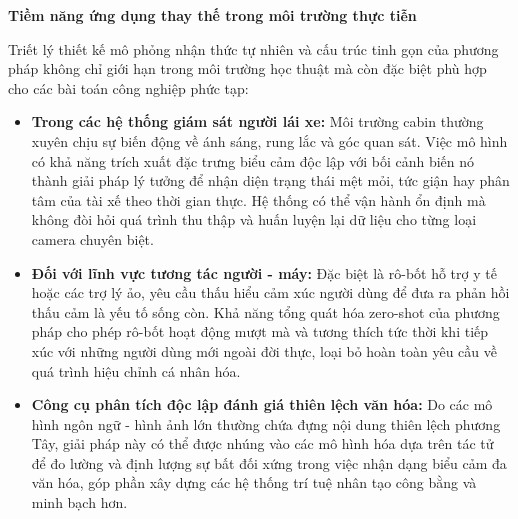 \vspace{0.5em}
\noindent\textbf{Tiềm năng ứng dụng thay thế trong môi trường thực tiễn}

Triết lý thiết kế mô phỏng nhận thức tự nhiên và cấu trúc tinh gọn của phương pháp không chỉ giới hạn trong môi trường học thuật mà còn đặc biệt phù hợp cho các bài toán công nghiệp phức tạp:

\begin{itemize}
    \item \textbf{Trong các hệ thống giám sát người lái xe:} Môi trường cabin thường xuyên chịu sự biến động về ánh sáng, rung lắc và góc quan sát. Việc mô hình có khả năng trích xuất đặc trưng biểu cảm độc lập với bối cảnh biến nó thành giải pháp lý tưởng để nhận diện trạng thái mệt mỏi, tức giận hay phân tâm của tài xế theo thời gian thực. Hệ thống có thể vận hành ổn định mà không đòi hỏi quá trình thu thập và huấn luyện lại dữ liệu cho từng loại camera chuyên biệt.
    
    \item \textbf{Đối với lĩnh vực tương tác người - máy:} Đặc biệt là rô-bốt hỗ trợ y tế hoặc các trợ lý ảo, yêu cầu thấu hiểu cảm xúc người dùng để đưa ra phản hồi thấu cảm là yếu tố sống còn. Khả năng tổng quát hóa zero-shot của phương pháp cho phép rô-bốt hoạt động mượt mà và tương thích tức thời khi tiếp xúc với những người dùng mới ngoài đời thực, loại bỏ hoàn toàn yêu cầu về quá trình hiệu chỉnh cá nhân hóa.
    
    \item \textbf{Công cụ phân tích độc lập đánh giá thiên lệch văn hóa:} Do các mô hình ngôn ngữ - hình ảnh lớn thường chứa đựng nội dung thiên lệch phương Tây, giải pháp này có thể được nhúng vào các mô hình hóa dựa trên tác tử để đo lường và định lượng sự bất đối xứng trong việc nhận dạng biểu cảm đa văn hóa, góp phần xây dựng các hệ thống trí tuệ nhân tạo công bằng và minh bạch hơn.
\end{itemize}